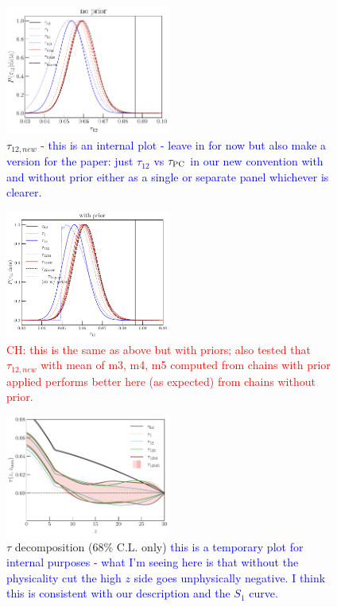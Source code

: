 \documentclass[prd,twocolumn,amsmath,amssymb,floatfix,superscriptaddress,nofootinbib]{revtex4-1}
\newcommand{\wh}[1]{\textcolor{blue}{#1}}
\newcommand{\ch}[1]{\textcolor{red}{#1}}
\begin{document}
{\begin{figure}[ht]
\includegraphics[width=0.48\textwidth]{results/tau_pc_decomposition/plot_taumj_decomposition_apply_cut_False_pl18_pc_zmax30_pliklite_srollv2_1015.pdf}
\caption{$\tau_{12,new}$ - \wh{this is an internal plot - leave in for now but also make a version for the paper: just $\tau_{12}$ vs $\tau_{\rm PC}$ in our new convention with and without prior either as a single or separate panel whichever is clearer.}}
\end{figure}

\begin{figure}[ht]
\includegraphics[width=0.48\textwidth]{results/tau_pc_decomposition/plot_taumj_decomposition_apply_cut_True_pl18_pc_zmax30_pliklite_srollv2_1015.pdf}
\caption{ \ch{CH: this is the same as above but with priors; also tested that $\tau_{12, new}$ with mean of m3, m4, m5 computed from chains with prior applied performs better here (as expected) from chains without prior.}}
\end{figure}



\begin{figure}[ht]
\includegraphics[width=0.48\textwidth]{results/tau_pc_decomposition/pl18_taugtz_pc_decomposition_68_only.pdf}
\caption{$\tau$ decomposition (68\% C.L. only) \wh{this is a temporary plot for internal purposes - what I'm seeing here is that without the physicality cut the high $z$ side goes unphysically negative.  I think this is consistent with our description and the $S_1$ curve.}}
\end{figure}

}
\end{document}
